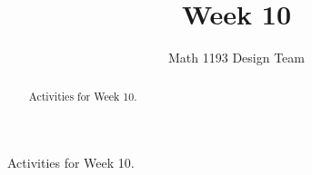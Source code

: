 \documentclass[noauthor]{ximera}
\title{Week 10}
\author{Math 1193 Design Team}
\begin{document}
\begin{abstract}
    Activities for Week 10.
\end{abstract}
\maketitle

Activities for Week 10.
\end{document}
